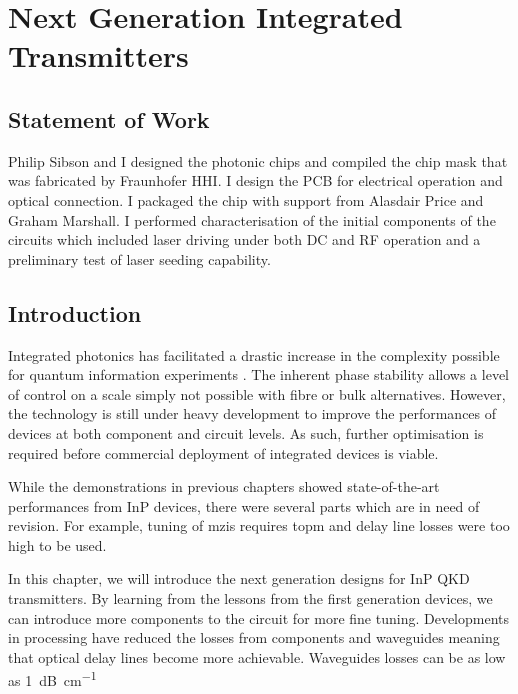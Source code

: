 %
\graphicspath{{./chapters/chapter06/fig06/}}

\let\textcircled=\pgftextcircled
\chapter{Next Generation Integrated Transmitters}
\label{chap:future}

\section*{Statement of Work}

Philip Sibson and I designed the photonic chips and compiled the chip mask that was fabricated by Fraunhofer HHI. I design the PCB for electrical operation and optical connection. I packaged the chip with support from Alasdair Price and Graham Marshall. I performed characterisation of the initial components of the circuits which included laser driving under both DC and RF operation and a preliminary test of laser seeding capability.

\section{Introduction}

Integrated photonics has facilitated a drastic increase in the complexity possible for quantum information experiments \cite{wang2019integrated}. The inherent phase stability allows a level of control on a scale simply not possible with fibre or bulk alternatives. However, the technology is still under heavy development to improve the performances of devices at both component and circuit levels. As such, further optimisation is required before commercial deployment of integrated devices is viable. 

While the demonstrations in previous chapters showed state-of-the-art performances from \ac{InP} devices, there were several parts which are in need of revision. For example, tuning of \acp{mzi} requires \ac{topm} and delay line losses were too high to be used. 

In this chapter, we will introduce the next generation designs for \ac{InP} \ac{QKD} transmitters. By learning from the lessons from the first generation devices, we can introduce more components to the circuit for more fine tuning. Developments in processing have reduced the losses from components and waveguides meaning that optical delay lines become more achievable. Waveguides losses can be as low as \SI{1}{dB\per\cm}


